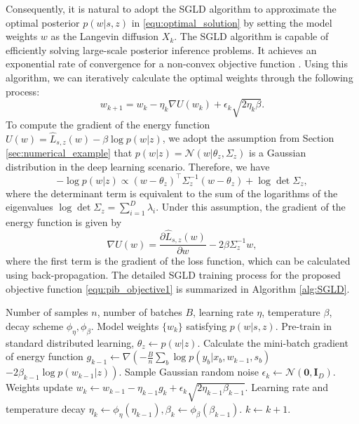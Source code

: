 \documentclass[lettersize,journal]{IEEEtran}
\theoremstyle{definition}
\theoremstyle{plain}
\begin{document}
Consequently, it is natural to adopt the SGLD algorithm to approximate the optimal posterior $p(w|s,z)$ in \cref{equ:optimal_solution} by setting the model weights $w$ as the Langevin diffusion $X_k$. 
The SGLD algorithm is capable of efficiently solving large-scale posterior inference problems. It achieves an exponential rate of convergence for a non-convex objective function \cite{Gibbs-convergence1}.
Using this algorithm, we can iteratively calculate the optimal weights through the following process:
\begin{equation}
    w_{k+1}=w_k - \eta_k\nabla U(w_k) + \epsilon_k\sqrt{2\eta_k\beta}.
\end{equation}
To compute the gradient of the energy function $U(w) = \hat{L}_{s,z}(w) - \beta \log p(w|z)$, we adopt the assumption from Section \ref{sec:numerical_example} that $p(w|z)=\mathcal{N}(w|\theta_z,\Sigma_z)$ is a Gaussian distribution in the deep learning scenario. 
Therefore, we have
\begin{equation}
    -\log p(w|z)\propto (w-\theta_z)^\top\Sigma_z^{-1}(w-\theta_z) + \log \det \Sigma_z,
\end{equation}
where the determinant term is equivalent to the sum of the logarithms of the eigenvalues $\log \det \Sigma_z = \sum_{i=1}^D\lambda_i$. 
Under this assumption, the gradient of the energy function is given by
\begin{equation}
    \nabla U(w) = \frac{\partial \hat{L}_{s,z}(w)}{\partial w} - 2\beta \Sigma_z^{-1}w,
\end{equation}
where the first term is the gradient of the loss function, which can be calculated using back-propagation.
The detailed SGLD training process for the proposed objective function \cref{equ:pib_objective1} is summarized in Algorithm \ref{alg:SGLD}. 
\begin{algorithm}
    \fontsize{9pt}{9pt}\selectfont
    \caption{SGLD training process}
    \label{alg:SGLD}
    \begin{algorithmic}[1]
        \REQUIRE Number of samples $n$, number of batches $B$, learning rate $\eta$, temperature $\beta$, decay scheme $\phi_\eta,\phi_\beta$.
        \ENSURE Model weights $\{w_k\}$ satisfying $p(w|s,z)$.
        \STATE Pre-train in standard distributed learning, $\theta_z\gets p(w|z)$.
        \REPEAT
            \STATE Calculate the mini-batch gradient of energy function $g_{k-1} \gets \nabla \left( -\frac{B}{n} \sum_b \log p(y_b | x_b, w_{k-1}, s_b)\right.$
            $\left.- 2\beta_{k-1} \log p(w_{k-1}|z) \right)$.
            \STATE Sample Gaussian random noise $\epsilon_k\gets \mathcal{N}(\mathbf{0},\mathbf{I}_D)$.
            \STATE Weights update $w_k\gets w_{k-1} - \eta_{k-1} g_k + \epsilon_k \sqrt{2\eta_{k-1} \beta_{k-1}} $.
            \STATE Learning rate and temperature decay $\eta_k\gets \phi_\eta(\eta_{k-1}),\beta_k\gets \phi_\beta(\beta_{k-1})$.
            \STATE $k\gets k+1$.
    \end{algorithmic}
\end{algorithm}
\end{document}
